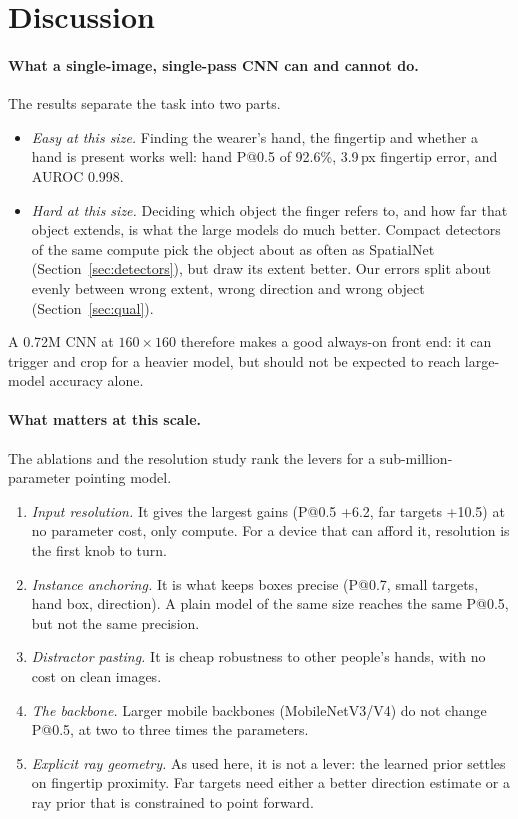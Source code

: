 \section{Discussion}\label{sec:discussion}

\paragraph{What a single-image, single-pass CNN can and cannot do.} The results separate the task into two parts.
\begin{itemize}
\item \emph{Easy at this size.} Finding the wearer's hand, the fingertip and whether a hand is present works well: hand P@0.5 of 92.6\%, 3.9\,px fingertip error, and AUROC 0.998.
\item \emph{Hard at this size.} Deciding which object the finger refers to, and how far that object extends, is what the large models do much better. Compact detectors of the same compute pick the object about as often as SpatialNet (Section~\ref{sec:detectors}), but draw its extent better. Our errors split about evenly between wrong extent, wrong direction and wrong object (Section~\ref{sec:qual}).
\end{itemize}
A 0.72M CNN at $160\times160$ therefore makes a good always-on front end: it can trigger and crop for a heavier model, but should not be expected to reach large-model accuracy alone.

\paragraph{What matters at this scale.} The ablations and the resolution study rank the levers for a sub-million-parameter pointing model.
\begin{enumerate}
\item \emph{Input resolution.} It gives the largest gains (P@0.5 +6.2, far targets +10.5) at no parameter cost, only compute. For a device that can afford it, resolution is the first knob to turn.
\item \emph{Instance anchoring.} It is what keeps boxes precise (P@0.7, small targets, hand box, direction). A plain model of the same size reaches the same P@0.5, but not the same precision.
\item \emph{Distractor pasting.} It is cheap robustness to other people's hands, with no cost on clean images.
\item \emph{The backbone.} Larger mobile backbones (MobileNetV3/V4) do not change P@0.5, at two to three times the parameters.
\item \emph{Explicit ray geometry.} As used here, it is not a lever: the learned prior settles on fingertip proximity. Far targets need either a better direction estimate or a ray prior that is constrained to point forward.
\end{enumerate}

